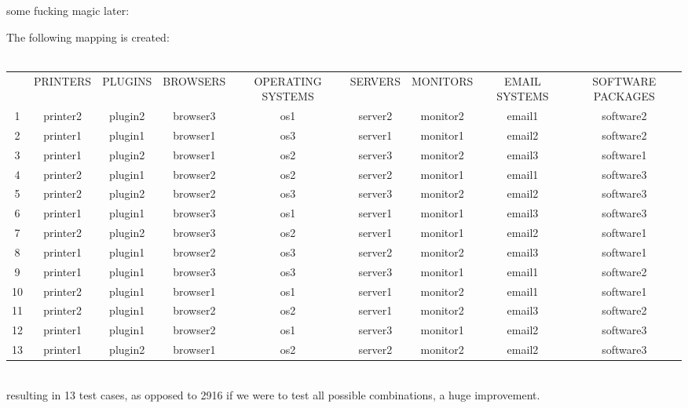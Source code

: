 \documentclass[letterpaper]{article}
\begin{document}
some fucking magic later: 


The following mapping is created:
\\ \\
\begin{adjustbox}{max width=1.5\textwidth, center}
	\begin{tabular}{ccccccccc}
		   & PRINTERS & PLUGINS & BROWSERS & OPERATING SYSTEMS & SERVERS & MONITORS & EMAIL SYSTEMS & SOFTWARE PACKAGES \\
		1  & printer2 & plugin2 & browser3 & os1               & server2 & monitor2 & email1        & software2         \\
		2  & printer1 & plugin1 & browser1 & os3               & server1 & monitor1 & email2        & software2         \\
		3  & printer1 & plugin2 & browser1 & os2               & server3 & monitor2 & email3        & software1         \\
		4  & printer2 & plugin1 & browser2 & os2               & server2 & monitor1 & email1        & software3         \\
		5  & printer2 & plugin2 & browser2 & os3               & server3 & monitor2 & email2        & software3         \\
		6  & printer1 & plugin1 & browser3 & os1               & server1 & monitor1 & email3        & software3         \\
		7  & printer2 & plugin2 & browser3 & os2               & server1 & monitor1 & email2        & software1         \\
		8  & printer1 & plugin1 & browser2 & os3               & server2 & monitor2 & email3        & software1         \\
		9  & printer1 & plugin1 & browser3 & os3               & server3 & monitor1 & email1        & software2         \\
		10 & printer2 & plugin1 & browser1 & os1               & server1 & monitor2 & email1        & software1         \\
		11 & printer2 & plugin1 & browser2 & os2               & server1 & monitor2 & email3        & software2         \\
		12 & printer1 & plugin1 & browser2 & os1               & server3 & monitor1 & email2        & software3         \\
		13 & printer1 & plugin2 & browser1 & os2               & server2 & monitor2 & email2        & software3
	\end{tabular}%
\end{adjustbox}
\\

resulting in 13 test cases, as opposed to 2916 if we were to test all possible
combinations, a huge improvement.
\end{document}
